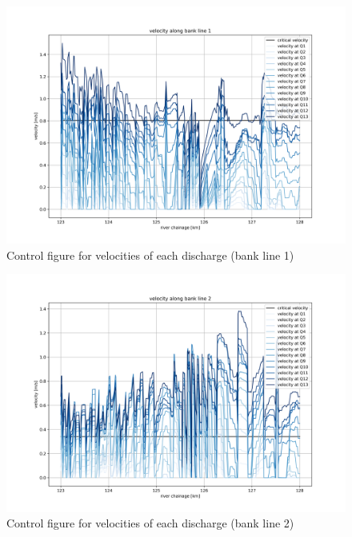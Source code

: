 \begin{figure}
\includegraphics[width=\textwidth]{figures/8_velocity_bank_1.png}
\caption{Control figure for velocities of each discharge (bank line 1)}
\label{Fig2.10}
\end{figure}

\begin{figure}
\includegraphics[width=\textwidth]{figures/9_velocity_bank_2.png}
\caption{Control figure for velocities of each discharge (bank line 2)}
\label{Fig2.11}
\end{figure}

